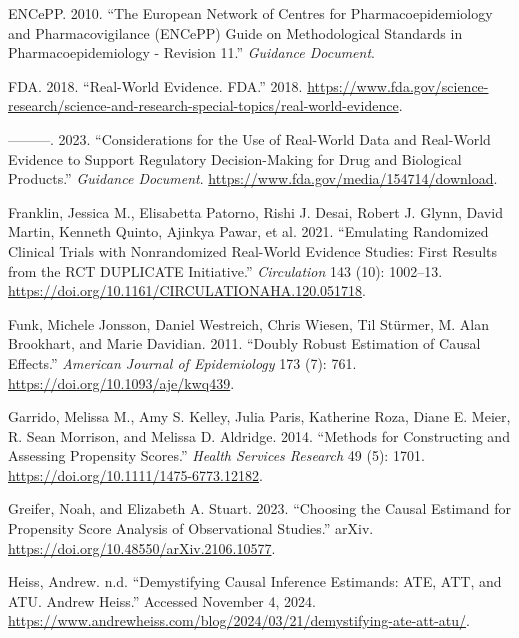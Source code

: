 \documentclass[
]{book}
\newlength{\cslhangindent}
\newenvironment{CSLReferences}[2] %
 {\begin{list}{}{%
  \setlength{\itemindent}{0pt}
  \setlength{\leftmargin}{0pt}
  \setlength{\parsep}{0pt}
  \ifodd #1
   \setlength{\leftmargin}{\cslhangindent}
   \setlength{\itemindent}{-1\cslhangindent}
  \fi
  \setlength{\itemsep}{#2\baselineskip}}}
 {\end{list}}
\begin{document}
\begin{CSLReferences}{1}{0}
ENCePP. 2010. {``The European Network of Centres for
Pharmacoepidemiology and Pharmacovigilance ({ENCePP}) Guide on
Methodological Standards in Pharmacoepidemiology - Revision 11.''}
\emph{Guidance Document}.

FDA. 2018. {``Real-World Evidence. {FDA}.''} 2018.
\url{https://www.fda.gov/science-research/science-and-research-special-topics/real-world-evidence}.

---------. 2023. {``Considerations for the Use of Real-World Data and
Real-World Evidence to Support Regulatory Decision-Making for Drug and
Biological Products.''} \emph{Guidance Document}.
\url{https://www.fda.gov/media/154714/download}.

Franklin, Jessica M., Elisabetta Patorno, Rishi J. Desai, Robert J.
Glynn, David Martin, Kenneth Quinto, Ajinkya Pawar, et al. 2021.
{``Emulating Randomized Clinical Trials with Nonrandomized Real-World
Evidence Studies: First Results from the {RCT} {DUPLICATE}
Initiative.''} \emph{Circulation} 143 (10): 1002--13.
\url{https://doi.org/10.1161/CIRCULATIONAHA.120.051718}.

Funk, Michele Jonsson, Daniel Westreich, Chris Wiesen, Til Stürmer, M.
Alan Brookhart, and Marie Davidian. 2011. {``Doubly Robust Estimation of
Causal Effects.''} \emph{American Journal of Epidemiology} 173 (7): 761.
\url{https://doi.org/10.1093/aje/kwq439}.

Garrido, Melissa M., Amy S. Kelley, Julia Paris, Katherine Roza, Diane
E. Meier, R. Sean Morrison, and Melissa D. Aldridge. 2014. {``Methods
for Constructing and Assessing Propensity Scores.''} \emph{Health
Services Research} 49 (5): 1701.
\url{https://doi.org/10.1111/1475-6773.12182}.

Greifer, Noah, and Elizabeth A. Stuart. 2023. {``Choosing the Causal
Estimand for Propensity Score Analysis of Observational Studies.''}
{arXiv}. \url{https://doi.org/10.48550/arXiv.2106.10577}.

Heiss, Andrew. n.d. {``Demystifying Causal Inference Estimands: {ATE},
{ATT}, and {ATU}. Andrew Heiss.''} Accessed November 4, 2024.
\url{https://www.andrewheiss.com/blog/2024/03/21/demystifying-ate-att-atu/}.


\end{CSLReferences}
\end{document}
